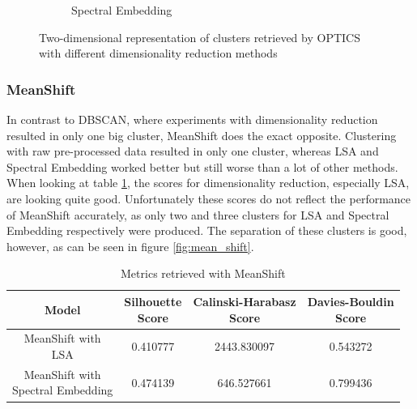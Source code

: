 \begin{figure}
\begin{subfigure}{.3\textwidth}
    \caption{Spectral Embedding}
    \label{fig:optics_spectral}
  \end{subfigure}
  \caption{Two-dimensional representation of clusters retrieved by OPTICS with different dimensionality reduction methods}
  \label{fig:optics}
\end{figure}

\subsubsection{MeanShift}

In contrast to DBSCAN, where experiments with dimensionality reduction resulted in only one big cluster, MeanShift does the exact opposite. Clustering with raw pre-processed data resulted in only one cluster, whereas LSA and Spectral Embedding worked better but still worse than a lot of other methods.
When looking at table \ref{tab:scores_mean_shift}, the scores for dimensionality reduction, especially LSA, are looking quite good. Unfortunately these scores do not reflect the performance of MeanShift accurately, as only two and three clusters for LSA and Spectral Embedding respectively were produced. The separation of these clusters is good, however, as can be seen in figure \ref{fig:mean_shift}.  

\begin{table}[]
  \centering
  \begin{tabular}{c|c|c|c}
    Model &  \shortstack[c]{Silhouette \\ Score} & \shortstack[c]{Calinski-Harabasz \\ Score} &  \shortstack[c]{Davies-Bouldin \\ Score}  \\
    \hline
    \hline
    \shortstack[c]{MeanShift with \\ LSA} & 0.410777 & 2443.830097 & 0.543272 \\
    \hline
    \shortstack[c]{MeanShift with \\ Spectral Embedding} & 0.474139 & 646.527661 & 0.799436 \\
   \end{tabular}
  \caption{Metrics retrieved with MeanShift}
  \label{tab:scores_mean_shift}
\end{table}

